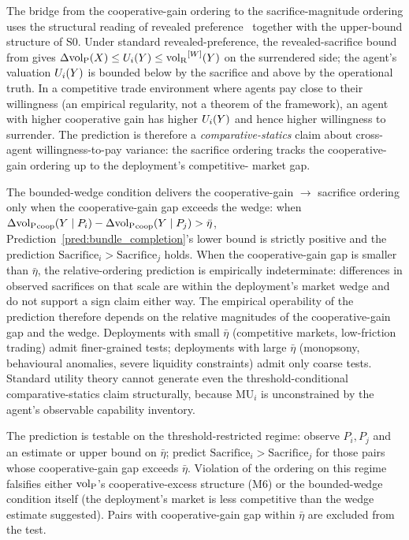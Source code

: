 The bridge from the cooperative-gain ordering to the
sacrifice-magnitude ordering uses the structural reading of
revealed preference~\citep{samuelson1938note} together with the
upper-bound structure of S0.  Under standard
revealed-preference, the revealed-sacrifice bound from
\citep[Theorem~2]{lasser2026paper8a} gives
$\Delta{\operatorname{vol}_{\mathrm{P}}}(X) \leq U_i(Y) \leq {\operatorname{vol}_{\mathrm{R}}}^{[W]}(Y)$ on the surrendered
side; the agent's valuation $U_i(Y)$ is bounded below by the
sacrifice and above by the operational truth.  In a competitive
trade environment where agents pay close to their willingness
(an empirical regularity, not a theorem of the framework), an
agent with higher cooperative gain has higher $U_i(Y)$ and hence
higher willingness to surrender.  The prediction is therefore a
\emph{comparative-statics} claim about cross-agent
willingness-to-pay variance: the sacrifice ordering tracks the
cooperative-gain ordering up to the deployment's competitive-
market gap.

\begin{remark}
\label{rem:pred1_comparative}
The bounded-wedge condition delivers the cooperative-gain $\to$
sacrifice ordering only when the cooperative-gain gap exceeds
the wedge: when
$\Delta{\operatorname{vol}_{\mathrm{P}}}_{\mathrm{coop}}(Y \mid P_i)
- \Delta{\operatorname{vol}_{\mathrm{P}}}_{\mathrm{coop}}(Y \mid P_j) > \bar\eta$,
Prediction~\ref{pred:bundle_completion}'s lower bound is strictly
positive and the prediction $\mathrm{Sacrifice}_i >
\mathrm{Sacrifice}_j$ holds.  When the cooperative-gain gap is
smaller than $\bar\eta$, the relative-ordering prediction is
empirically indeterminate: differences in observed sacrifices on
that scale are within the deployment's market wedge and do not
support a sign claim either way.  The empirical operability of
the prediction therefore depends on the relative magnitudes of
the cooperative-gain gap and the wedge.  Deployments with small
$\bar\eta$ (competitive markets, low-friction trading) admit
finer-grained tests; deployments with large $\bar\eta$
(monopsony, behavioural anomalies, severe liquidity constraints)
admit only coarse tests.  Standard utility theory cannot
generate even the threshold-conditional comparative-statics
claim structurally, because $\mathrm{MU}_i$ is unconstrained by
the agent's observable capability inventory.
\end{remark}

The prediction is testable on the threshold-restricted regime:
observe $P_i, P_j$ and an estimate or upper bound on $\bar\eta$;
predict $\mathrm{Sacrifice}_i > \mathrm{Sacrifice}_j$ for those
pairs whose cooperative-gain gap exceeds $\bar\eta$.  Violation
of the ordering on this regime falsifies either ${\operatorname{vol}_{\mathrm{P}}}$'s
cooperative-excess structure (M6) or the bounded-wedge condition
itself (the deployment's market is less competitive than the
wedge estimate suggested).  Pairs with cooperative-gain gap
within $\bar\eta$ are excluded from the test.

